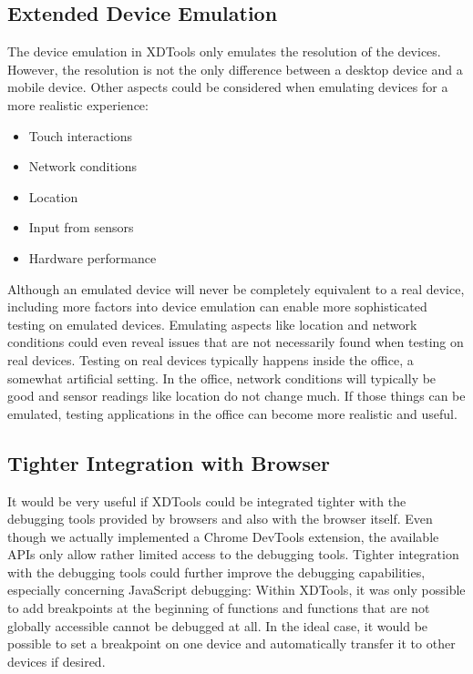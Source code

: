 \subsection{Extended Device Emulation}

The device emulation in XDTools only emulates the resolution of the devices. However, the resolution is not the only difference between a desktop device and a mobile device. Other aspects could be considered when emulating devices for a more realistic experience:
\begin{itemize}
	\item Touch interactions
	\item Network conditions
	\item Location
	\item Input from sensors
	\item Hardware performance
\end{itemize}
Although an emulated device will never be completely equivalent to a real device, including more factors into device emulation can enable more sophisticated testing on emulated devices. Emulating aspects like location and network conditions could even reveal issues that are not necessarily found when testing on real devices. Testing on real devices typically happens inside the office, a somewhat artificial setting. In the office, network conditions will typically be good and sensor readings like location do not change much. If those things can be emulated, testing applications in the office can become more realistic and useful.

\subsection{Tighter Integration with Browser}

It would be very useful if XDTools could be integrated tighter with the debugging tools provided by browsers and also with the browser itself. Even though we actually implemented a Chrome DevTools extension, the available APIs only allow rather limited access to the debugging tools. Tighter integration with the debugging tools could further improve the debugging capabilities, especially concerning JavaScript debugging: Within XDTools, it was only possible to add breakpoints at the beginning of functions and functions that are not globally accessible cannot be debugged at all. In the ideal case, it would be possible to set a breakpoint on one device and automatically transfer it to other devices if desired. 

